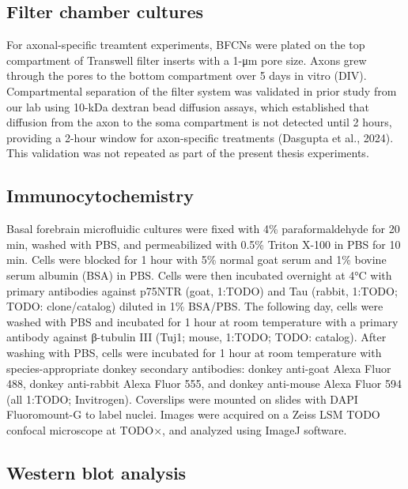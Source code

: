 \documentclass[
  letterpaper,
  DIV=11,
  numbers=noendperiod]{scrreprt}
\begin{document}
\subsection{Filter chamber cultures}\label{filter-chamber-cultures}

For axonal-specific treamtent experiments, BFCNs were plated on the top
compartment of Transwell filter inserts with a 1-μm pore size. Axons
grew through the pores to the bottom compartment over 5 days in vitro
(DIV). Compartmental separation of the filter system was validated in
prior study from our lab using 10-kDa dextran bead diffusion assays,
which established that diffusion from the axon to the soma compartment
is not detected until 2 hours, providing a 2-hour window for
axon-specific treatments (Dasgupta et al., 2024). This validation was
not repeated as part of the present thesis experiments.

\subsection{Immunocytochemistry}\label{immunocytochemistry}

Basal forebrain microfluidic cultures were fixed with 4\%
paraformaldehyde for 20 min, washed with PBS, and permeabilized with
0.5\% Triton X-100 in PBS for 10 min. Cells were blocked for 1 hour with
5\% normal goat serum and 1\% bovine serum albumin (BSA) in PBS. Cells
were then incubated overnight at 4°C with primary antibodies against
p75NTR (goat, 1:TODO) and Tau (rabbit, 1:TODO; TODO: clone/catalog)
diluted in 1\% BSA/PBS. The following day, cells were washed with PBS
and incubated for 1 hour at room temperature with a primary antibody
against β-tubulin III (Tuj1; mouse, 1:TODO; TODO: catalog). After
washing with PBS, cells were incubated for 1 hour at room temperature
with species-appropriate donkey secondary antibodies: donkey anti-goat
Alexa Fluor 488, donkey anti-rabbit Alexa Fluor 555, and donkey
anti-mouse Alexa Fluor 594 (all 1:TODO; Invitrogen). Coverslips were
mounted on slides with DAPI Fluoromount-G to label nuclei. Images were
acquired on a Zeiss LSM TODO confocal microscope at TODO×, and analyzed
using ImageJ software.

\subsection{Western blot analysis}\label{western-blot-analysis}
\end{document}
